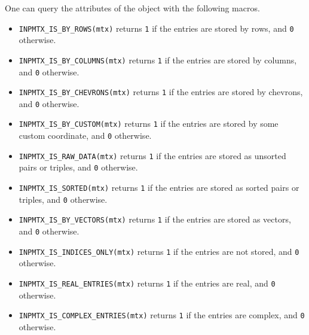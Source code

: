 \par
One can query the attributes of the object with the following
macros.
\begin{itemize}
\item
{\tt INPMTX\_IS\_BY\_ROWS(mtx)} returns {\tt 1} if the entries are
stored by rows, and {\tt 0} otherwise.
\item
{\tt INPMTX\_IS\_BY\_COLUMNS(mtx)} returns {\tt 1} if the entries are
stored by columns, and {\tt 0} otherwise.
\item
{\tt INPMTX\_IS\_BY\_CHEVRONS(mtx)} returns {\tt 1} if the entries are
stored by chevrons, and {\tt 0} otherwise.
\item
{\tt INPMTX\_IS\_BY\_CUSTOM(mtx)} returns {\tt 1} if the entries are
stored by some custom coordinate, and {\tt 0} otherwise.
\item
{\tt INPMTX\_IS\_RAW\_DATA(mtx)} returns {\tt 1} if the entries are
stored as unsorted pairs or triples, and {\tt 0} otherwise.
\item
{\tt INPMTX\_IS\_SORTED(mtx)} returns {\tt 1} if the entries are
stored as sorted pairs or triples, and {\tt 0} otherwise.
\item
{\tt INPMTX\_IS\_BY\_VECTORS(mtx)} returns {\tt 1} if the entries are
stored as vectors, and {\tt 0} otherwise.
\item
{\tt INPMTX\_IS\_INDICES\_ONLY(mtx)} returns {\tt 1} if the entries are
not stored, and {\tt 0} otherwise.
\item
{\tt INPMTX\_IS\_REAL\_ENTRIES(mtx)} returns {\tt 1} 
if the entries are real, and {\tt 0} otherwise.
\item
{\tt INPMTX\_IS\_COMPLEX\_ENTRIES(mtx)} returns {\tt 1} 
if the entries are complex, and {\tt 0} otherwise.
\end{itemize}
